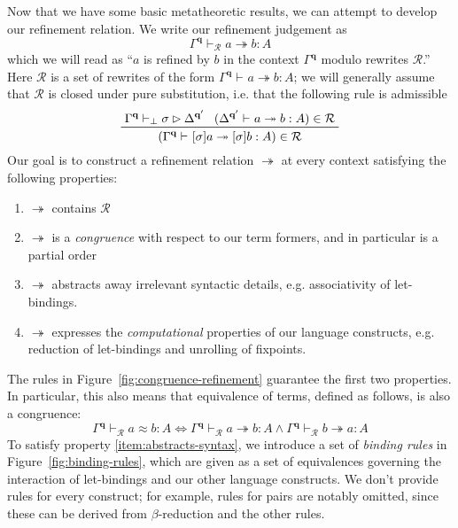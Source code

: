 \documentclass[acmsmall,screen,review]{acmart}
\newcommand{\mc}[1]{\ensuremath{\mathcal{#1}}}
\newcommand{\mb}[1]{\ensuremath{\mathbf{#1}}}
\newcommand{\issubst}[4]{#1 \vdash_{#2} #3 \rhd #4}
\newcommand{\teqv}{\approx}
\newcommand{\tref}{\twoheadrightarrow}
\newcommand{\tmle}[5]{#1 \vdash_{#2} #3 \tref #4 : {#5}}
\newcommand{\tmeq}[5]{#1 \vdash_{#2} #3 \teqv #4 : {#5}}
\begin{document}
Now that we have some basic metatheoretic results, we can attempt to develop our refinement
relation. We write our refinement judgement as
\begin{equation*}
  \tmle{\Gamma^{\mb{q}}}{\mc{R}}{a}{b}{A}
\end{equation*}
which we will read as ``$a$ is refined by $b$ in the context $\Gamma^{\mb{q}}$ modulo rewrites
$\mc{R}$.'' Here $\mc{R}$ is a set of rewrites of the form $\tmle{\Gamma^{\mb{q}}}{}{a}{b}{A}$; we
will generally assume that $\mc{R}$ is closed under pure substitution, i.e. that the following rule
is admissible
\begin{equation*}
  \prftree[r]{}
    {\issubst{\Gamma^{\mb{q}}}{\bot}{\sigma}{\Delta^{\mb{q}'}}}
    {(\tmle{\Delta^{\mb{q}'}}{}{a}{b}{A}) \in \mc{R}}
    {(\tmle{\Gamma^{\mb{q}}}{}{[\sigma]a}{[\sigma]b}{A}) \in \mc{R}} 
\end{equation*}
Our goal is to construct a refinement relation $\tref$ at every context
satisfying the following properties: 
\begin{enumerate}
  \item $\tref$ contains $\mc{R}$
  \item $\tref$ is a \emph{congruence} with respect to our term formers, and in particular is a
  partial order
  \item $\tref$ abstracts away irrelevant syntactic details, e.g. associativity of let-bindings.
  \label{item:abstracts-syntax}
  \item $\tref$ expresses the \emph{computational} properties of our language constructs, e.g.
  reduction of let-bindings and unrolling of fixpoints.
  \label{item:does-computation}
\end{enumerate}
The rules in Figure~\ref{fig:congruence-refinement} guarantee the first two properties. In
particular, this also means that equivalence of terms, defined as follows, is also a congruence:
\begin{equation}
  \tmeq{\Gamma^{\mb{q}}}{\mc{R}}{a}{b}{A}
  \iff \tmle{\Gamma^{\mb{q}}}{\mc{R}}{a}{b}{A} 
  \land \tmle{\Gamma^{\mb{q}}}{\mc{R}}{b}{a}{A}
\end{equation}
To satisfy property \ref{item:abstracts-syntax}, we introduce a set of \emph{binding rules} in
Figure~\ref{fig:binding-rules}, which are given as a set of equivalences governing the interaction
of let-bindings and our other language constructs. We don't provide rules for every construct;
for example, rules for pairs are notably omitted, since these can be derived from $\beta$-reduction
and the other rules.
\end{document}
